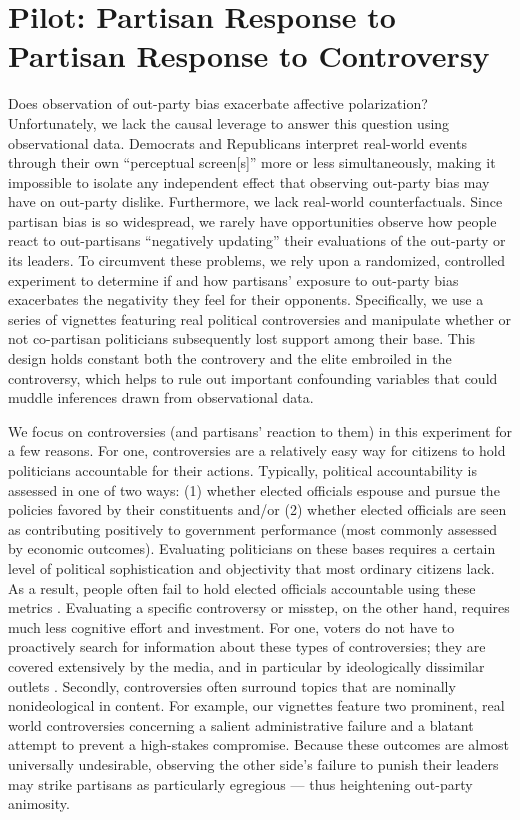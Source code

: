 \documentclass[12pt, letterpaper]{article}
\begin{document}
{\section*{Pilot: Partisan Response to Partisan Response to Controversy}

Does observation of out-party bias exacerbate affective polarization? Unfortunately, we lack the causal leverage to answer this question using observational data. Democrats and Republicans interpret real-world events through their own ``perceptual screen[s]'' \citep{campbell1960} more or less simultaneously, making it impossible to isolate any independent effect that observing out-party bias may have on out-party dislike. Furthermore, we lack real-world counterfactuals. Since partisan bias is so widespread, we rarely have opportunities observe how people react to out-partisans ``negatively updating'' their evaluations of the out-party or its leaders. To circumvent these problems, we rely upon a randomized, controlled experiment to determine if and how partisans' exposure to out-party bias exacerbates the negativity they feel for their opponents. Specifically, we use a series of vignettes featuring real political controversies and manipulate whether or not co-partisan politicians subsequently lost support among their base. This design holds constant both the controvery and the elite embroiled in the controversy, which helps to rule out important confounding variables that could muddle inferences drawn from observational data. 

We focus on controversies (and partisans' reaction to them) in this experiment for a few reasons. For one, controversies are a relatively easy way for citizens to hold politicians accountable for their actions. Typically, political accountability is assessed in one of two ways:  (1) whether elected officials espouse and pursue the policies favored by their constituents and/or (2) whether elected officials are seen as contributing positively to government performance (most commonly assessed by economic outcomes). Evaluating politicians on these bases requires a certain level of political sophistication and objectivity that most ordinary citizens lack. As a result, people often fail to hold elected officials accountable using these metrics \citep[e.g.,][]{achen2016democracy,Bartels2008,healylenz_2014,Lenz2012,snidermanstiglitz_2012,soodiyengar_2014}. Evaluating a specific controversy or misstep, on the other hand, requires much less cognitive effort and investment. For one, voters do not have to proactively search for information about these types of controversies; they are covered extensively by the media, and in particular by ideologically dissimilar outlets \citep{budaketal_2016,puglisisnyder_2011}. Secondly, controversies often surround topics that are nominally nonideological in content. For example, our vignettes feature two prominent, real world controversies concerning a salient administrative failure and a blatant attempt to prevent a high-stakes compromise. Because these outcomes are almost universally undesirable, observing the other side's failure to punish their leaders may strike partisans as particularly egregious --- thus heightening out-party animosity. 

}
\end{document}
